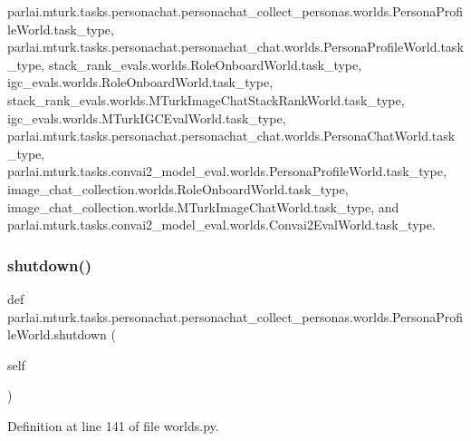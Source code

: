 parlai.\+mturk.\+tasks.\+personachat.\+personachat\+\_\+collect\+\_\+personas.\+worlds.\+Persona\+Profile\+World.\+task\+\_\+type, parlai.\+mturk.\+tasks.\+personachat.\+personachat\+\_\+chat.\+worlds.\+Persona\+Profile\+World.\+task\+\_\+type, stack\+\_\+rank\+\_\+evals.\+worlds.\+Role\+Onboard\+World.\+task\+\_\+type, igc\+\_\+evals.\+worlds.\+Role\+Onboard\+World.\+task\+\_\+type, stack\+\_\+rank\+\_\+evals.\+worlds.\+M\+Turk\+Image\+Chat\+Stack\+Rank\+World.\+task\+\_\+type, igc\+\_\+evals.\+worlds.\+M\+Turk\+I\+G\+C\+Eval\+World.\+task\+\_\+type, parlai.\+mturk.\+tasks.\+personachat.\+personachat\+\_\+chat.\+worlds.\+Persona\+Chat\+World.\+task\+\_\+type, parlai.\+mturk.\+tasks.\+convai2\+\_\+model\+\_\+eval.\+worlds.\+Persona\+Profile\+World.\+task\+\_\+type, image\+\_\+chat\+\_\+collection.\+worlds.\+Role\+Onboard\+World.\+task\+\_\+type, image\+\_\+chat\+\_\+collection.\+worlds.\+M\+Turk\+Image\+Chat\+World.\+task\+\_\+type, and parlai.\+mturk.\+tasks.\+convai2\+\_\+model\+\_\+eval.\+worlds.\+Convai2\+Eval\+World.\+task\+\_\+type.

\mbox{\label{classparlai_1_1mturk_1_1tasks_1_1personachat_1_1personachat__collect__personas_1_1worlds_1_1PersonaProfileWorld_a525201b855f68d1bfa1823c7c81284ec}} 
\subsubsection{\texorpdfstring{shutdown()}{shutdown()}}
{\footnotesize\ttfamily def parlai.\+mturk.\+tasks.\+personachat.\+personachat\+\_\+collect\+\_\+personas.\+worlds.\+Persona\+Profile\+World.\+shutdown (\begin{DoxyParamCaption}\item[{}]{self }\end{DoxyParamCaption})}



Definition at line 141 of file worlds.\+py.



